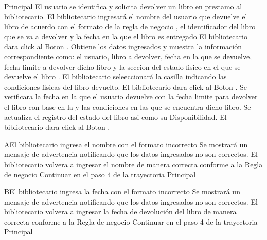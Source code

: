 	\begin{UCtrayectoria}{Principal}
		\UCpaso[\UCactor] El usuario se identifica y solicita devolver un libro en prestamo al bibliotecario.  
		\UCpaso[\UCactor] El bibliotecario ingresará el nombre del usuario que devuelve el libro de acuerdo con el formato de la regla de negocio , el identificador del libro que se va a devolver y la fecha en la que el libro es entregado   
		\UCpaso[\UCactor] El bibliotecario dara click al Boton .
				\UCpaso[\UCsist] Obtiene los datos ingresados y muestra la información correspondiente como: el usuario, libro a devolver, fecha en la que se devuelve, fecha limite a devolver dicho libro y la seccion del estado fisico en el que se devuelve el libro .
\UCpaso[\UCactor] El bibliotecario seleeccionará la casilla indicando las condiciones fisicas del libro devuelto.						
						\UCpaso[\UCactor] El bibliotecario dara click al Boton  .
		\UCpaso[\UCsist] Se verificara la fecha en la que el usuario devuelve con la fecha limite para devolver el libro con base en la  y las condiciones en las que se encuentra dicho libro. 
				\UCpaso[\UCsist] Se actualiza el registro del estado del libro asi como su Disponibilidad.   
	\UCpaso[\UCactor] El bibliotecario dara click al Boton .
	\end{UCtrayectoria}
				\begin{UCtrayectoriaA}{A}{El bibliotecario ingresa el nombre con el formato incorrecto}
			\UCpaso[\UCsist] Se mostrará un mensaje de advertencia notificando que los datos ingresados no son correctos. 
			\UCpaso[\UCactor] El bibliotecario volvera a ingresar el nombre de manera correcta conforme a la Regla de negocio  
			\UCpaso[\UCsist]Continuar en el paso 4 de la trayectoria Principal
		\end{UCtrayectoriaA}
		
		
\begin{UCtrayectoriaA}{B}{El bibliotecario ingresa la fecha con el formato incorrecto}
			\UCpaso[\UCsist] Se mostrará un mensaje de advertencia notificando que los datos ingresados no son correctos. 
			\UCpaso[\UCactor] El bibliotecario volvera a ingresar la fecha de devolución del libro de manera correcta conforme a la Regla de negocio 
			\UCpaso[\UCsist]Continuar en el paso 4 de la trayectoria Principal 
		\end{UCtrayectoriaA}




